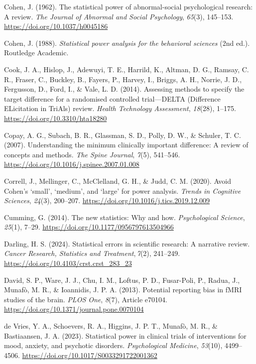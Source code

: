 \documentclass[authordate, meta]{jote-new-article}
\begin{document}
	Cohen, J. (1962). The statistical power of abnormal-social psychological research: A review. \emph{The Journal of Abnormal and Social Psychology}, \emph{65}(3), 145--153. \url{https://doi.org/10.1037/h0045186}



	Cohen, J. (1988). \emph{Statistical power analysis for the behavioral sciences} (2nd ed.). Routledge Academic.



	Cook, J. A., Hislop, J., Adewuyi, T. E., Harrild, K., Altman, D. G., Ramsay, C. R., Fraser, C., Buckley, B., Fayers, P., Harvey, I., Briggs, A. H., Norrie, J. D., Fergusson, D., Ford, I., \& Vale, L. D. (2014). Assessing methods to specify the target difference for a randomised controlled trial—DELTA (Difference ELicitation in TriAls) review. \emph{Health Technology Assessment}, \emph{18}(28), 1--175. \url{https://doi.org/10.3310/hta18280}



	Copay, A. G., Subach, B. R., Glassman, S. D., Polly, D. W., \& Schuler, T. C. (2007). Understanding the minimum clinically important difference: A review of concepts and methods. \emph{The Spine Journal}, \emph{7}(5), 541--546. \url{https://doi.org/10.1016/j.spinee.2007.01.008}



	Correll, J., Mellinger, C., McClelland, G. H., \& Judd, C. M. (2020). Avoid Cohen's ‘small', ‘medium', and ‘large' for power analysis. \emph{Trends in Cognitive Sciences}, \emph{24}(3), 200--207. \url{https://doi.org/10.1016/j.tics.2019.12.009}



	Cumming, G. (2014). The new statistics: Why and how. \emph{Psychological Science}, \emph{25}(1), 7--29. \url{https://doi.org/10.1177/0956797613504966}



	Darling, H. S. (2024). Statistical errors in scientific research: A narrative review. \emph{Cancer Research, Statistics and Treatment}, \emph{7}(2), 241--249. \url{https://doi.org/10.4103/crst.crst\_283\_23}



	David, S. P., Ware, J. J., Chu, I. M., Loftus, P. D., Fusar-Poli, P., Radua, J., Munafò, M. R., \& Ioannidis, J. P. A. (2013). Potential reporting bias in fMRI studies of the brain. \emph{PLOS One}, \emph{8}(7), Article e70104. \url{https://doi.org/10.1371/journal.pone.0070104}



	de Vries, Y. A., Schoevers, R. A., Higgins, J. P. T., Munafò, M. R., \& Bastiaansen, J. A. (2023). Statistical power in clinical trials of interventions for mood, anxiety, and psychotic disorders. \emph{Psychological Medicine}, \emph{53}(10), 4499--4506. \url{https://doi.org/10.1017/S0033291722001362}
\end{document}
